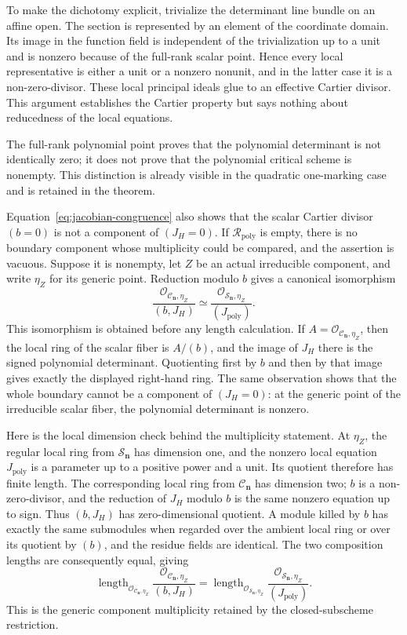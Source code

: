 \documentclass[11pt]{article}
\theoremstyle{definition}
\theoremstyle{remark}
\newcommand{\cC}{\mathcal C}
\newcommand{\cR}{\mathcal R}
\newcommand{\cS}{\mathcal S}
\newcommand{\bn}{\mathbf n}
\begin{document}
To make the dichotomy explicit, trivialize the determinant line bundle on
an affine open.  The section is represented by an element of the coordinate
domain.  Its image in the function field is independent of the
trivialization up to a unit and is nonzero because of the full-rank scalar
point.  Hence every local representative is either a unit or a nonzero
nonunit, and in the latter case it is a non-zero-divisor.  These local
principal ideals glue to an effective Cartier divisor.  This argument
establishes the Cartier property but says nothing about reducedness of the
local equations.

The full-rank polynomial point proves that the polynomial determinant is not
identically zero; it does not prove that the polynomial critical scheme is
nonempty.  This distinction is already visible in the quadratic one-marking
case and is retained in the theorem.

Equation~\eqref{eq:jacobian-congruence} also shows that the scalar Cartier
divisor $(b=0)$ is not a component of $(J_H=0)$.  If
$\cR_{\mathrm{poly}}$ is empty, there is no boundary component whose
multiplicity could be compared, and the assertion is vacuous.  Suppose it
is nonempty, let $Z$ be an actual irreducible component, and write $\eta_Z$
for its generic point.  Reduction modulo $b$ gives a canonical isomorphism
\[
  \frac{\mathcal O_{\cC_{\bn},\eta_Z}}{(b,J_H)}
  \simeq
  \frac{\mathcal O_{\cS_{\bn},\eta_Z}}{(J_{\mathrm{poly}})}.
\]
This isomorphism is obtained before any length calculation.  If
$A=\mathcal O_{\cC_{\bn},\eta_Z}$, then the local ring of the scalar fiber
is $A/(b)$, and the image of $J_H$ there is the signed polynomial
determinant.  Quotienting first by $b$ and then by that image gives exactly
the displayed right-hand ring.  The same observation shows that the whole
boundary cannot be a component of $(J_H=0)$: at the generic point of the
irreducible scalar fiber, the polynomial determinant is nonzero.

Here is the local dimension check behind the multiplicity statement.  At
$\eta_Z$, the regular local ring from $\cS_{\bn}$ has dimension one, and
the nonzero local equation $J_{\mathrm{poly}}$ is a parameter up to a
positive power and a unit.  Its quotient therefore has finite length.  The
corresponding local ring from $\cC_{\bn}$ has dimension two; $b$ is a
non-zero-divisor, and the reduction of $J_H$ modulo $b$ is the same
nonzero equation up to sign.  Thus $(b,J_H)$ has zero-dimensional quotient.
A module killed by $b$ has exactly the same submodules when regarded over
the ambient local ring or over its quotient by $(b)$, and the residue fields
are identical.  The two composition lengths are consequently equal, giving
\begin{equation}
\label{eq:length-equality}
  \operatorname{length}_{\mathcal O_{\cC_{\bn},\eta_Z}}
  \frac{\mathcal O_{\cC_{\bn},\eta_Z}}{(b,J_H)}
  =
  \operatorname{length}_{\mathcal O_{\cS_{\bn},\eta_Z}}
  \frac{\mathcal O_{\cS_{\bn},\eta_Z}}{(J_{\mathrm{poly}})}.
\end{equation}
This is the generic component multiplicity retained by the closed-subscheme
restriction.
\end{document}
